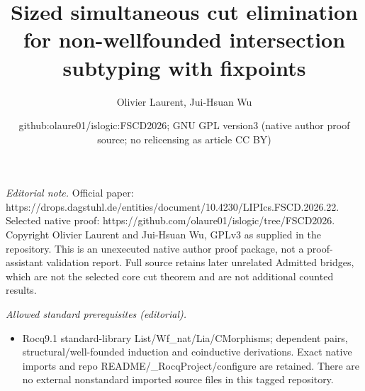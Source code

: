 \documentclass[10pt,a4paper]{article}
\title{Sized simultaneous cut elimination for non-wellfounded intersection subtyping with fixpoints}
\author{Olivier Laurent, Jui-Hsuan Wu}
\date{github:olaure01/islogic:FSCD2026; GNU GPL version3 (native author proof source; no relicensing as article CC BY)}
\begin{document}
\maketitle
\noindent\textit{Editorial note.} Official paper: https://drops.dagstuhl.de/entities/document/10.4230/LIPIcs.FSCD.2026.22. Selected native proof: https://github.com/olaure01/islogic/tree/FSCD2026. Copyright Olivier Laurent and Jui-Hsuan Wu, GPLv3 as supplied in the repository. This is an unexecuted native author proof package, not a proof-assistant validation report. Full source retains later unrelated Admitted bridges, which are not the selected core cut theorem and are not additional counted results.\par\medskip
\noindent\textit{Allowed standard prerequisites (editorial).}\begin{itemize}
\item Rocq9.1 standard-library List/Wf\_nat/Lia/CMorphisms; dependent pairs, structural/well-founded induction and coinductive derivations. Exact native imports and repo README/\_RocqProject/configure are retained. There are no external nonstandard imported source files in this tagged repository.
\end{itemize}\medskip
\end{document}
